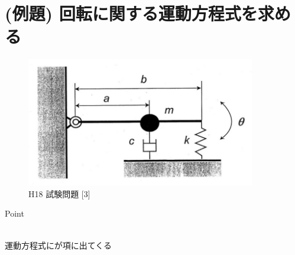 \documentclass[a4paper]{jsarticle}
\begin{document}
\section{(例題) 回転に関する運動方程式を求める}
\begin{figure}[htbp]
    \begin{center}
        \includegraphics[width=100mm]{images/kiriki_image2.jpg}
        \caption{H18 試験問題 [3]}
    \end{center}
\end{figure}
\begin{itembox}[l]{Point}
    \begin{center}
        \\
        運動方程式にが項に出てくる
    \end{center}
\end{itembox}
\end{document}
